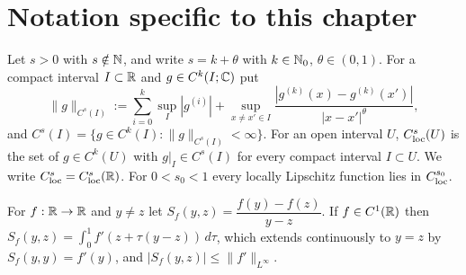 %

\section{Notation specific to this chapter}

\begin{definition}
  \label{def:c03_holder}
  Let $s>0$ with $s\notin\mathbb{N}$, and write $s=k+\theta$ with $k\in\mathbb{N}_0$, $\theta\in(0,1)$.
  For a compact interval $I\subset\mathbb{R}$ and $g\in C^k(I;\mathbb{C})$ put
  \[
    \|g\|_{C^s(I)}:=\sum_{i=0}^k\sup_I|g^{(i)}|
    +\sup_{x\neq x'\in I}\frac{|g^{(k)}(x)-g^{(k)}(x')|}{|x-x'|^\theta},
  \]
  and $C^s(I)=\{g\in C^k(I):\|g\|_{C^s(I)}<\infty\}$.
  For an open interval $U$, $C^s_{\textup{loc}}(U)$ is the set of $g\in C^k(U)$ with
  $g|_I\in C^s(I)$ for every compact interval $I\subset U$. We write $C^s_{\textup{loc}}=C^s_{\textup{loc}}(\mathbb{R})$.
  For $0<s_0<1$ every locally Lipschitz function lies in $C^{s_0}_{\textup{loc}}$.
\end{definition}

\begin{definition}[Secant]
  \label{def:c03_secant}
  For $f:\mathbb{R}\to\mathbb{R}$ and $y\neq z$ let $S_f(y,z)=\dfrac{f(y)-f(z)}{y-z}$.
  If $f\in C^1(\mathbb{R})$ then $S_f(y,z)=\int_0^1f'(z+\tau(y-z))\,d\tau$, which extends continuously
  to $y=z$ by $S_f(y,y)=f'(y)$, and $|S_f(y,z)|\le\|f'\|_{L^\infty}$.
\end{definition}

